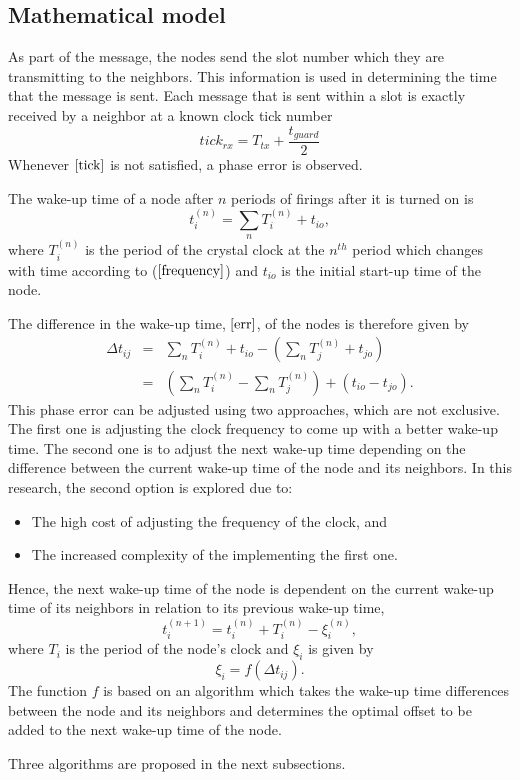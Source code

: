 \documentclass[journal]{IEEEtran}
\begin{document}
\subsection{\textbf{Mathematical model}}
As part of the message, the nodes send the slot number which they
are transmitting to the neighbors. This information is used in
determining the time that the message is sent. Each message that is
sent within a slot is exactly received by a neighbor at a known
clock tick number
\begin{equation}
tick_{rx} = T_{tx}+ \frac{t_{guard}}{2} \label{tick}
\end{equation}
Whenever $\ref{tick}$ is not satisfied, a phase error is observed. \par
The wake-up time of a node after $n$ periods of firings after it is turned on is
\begin{equation}
t_i^{(n)} = \sum_{n} T_i^{(n)} + t_{io},
\end{equation}
where  $T_i^{(n)}$ is the period of the crystal clock at the $n^{th}$ period which changes with time according to ($\ref{frequency}$) and $t_{io}$ is the initial start-up time of the node.\par
The difference in the wake-up time, $\ref{err}$, of the nodes is therefore given by
\begin{eqnarray}
\Delta t_{ij} & = & \sum_{n}T_i^{(n)} + t_{io}- (\sum_{n}T_j^{(n)} +
t_{jo}) \\ &=& (\sum_{n}T_i^{(n)} - \sum_{n}T_j^{(n)}) +
(t_{io}-t_{jo}).
\end{eqnarray}
This phase error can be adjusted using two approaches, which are not exclusive. The first
one is adjusting the clock frequency to come up with a better
wake-up time. The second one is to adjust the next wake-up time
depending on the difference between the current wake-up time of the
node and its neighbors. In this research, the second option is
explored due to:
\begin{itemize}
\item The high cost of adjusting the frequency of the clock, and
\item The increased complexity of the implementing the first one.
\end{itemize}
Hence, the next wake-up time of the node is
dependent on the current wake-up time of its neighbors in relation
to its previous wake-up time,
\begin{equation}
t_i^{(n+1)} = t_i^{(n)} + T_i^{(n)} - \xi_i^{(n)} ,
\end{equation}
where $T_i$ is the period of the node's clock and $\xi_i$ is given
by
\begin{equation}
\xi_i = f(\Delta t_{ij}).
\end{equation}
The function $f$ is based on an algorithm which takes the wake-up
time differences between the node and its neighbors and determines
the optimal offset to be added to the next wake-up time of the node.
\par Three algorithms are proposed in the next subsections.
\end{document}
